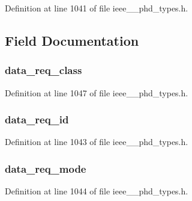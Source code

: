 Definition at line 1041 of file ieee\+\_\+\_\+phd\+\_\+types.\+h.



\subsection{Field Documentation}
\hypertarget{struct___data_request_a0337e79eff177bd5bdc454d9d86aff34}{}
\subsubsection[{data\+\_\+req\+\_\+class}]{ data\+\_\+req\+\_\+class}\label{struct___data_request_a0337e79eff177bd5bdc454d9d86aff34}


Definition at line 1047 of file ieee\+\_\+\_\+phd\+\_\+types.\+h.

\hypertarget{struct___data_request_a1c786af4096ed61c5f6cfdf27f317b70}{}
\subsubsection[{data\+\_\+req\+\_\+id}]{ data\+\_\+req\+\_\+id}\label{struct___data_request_a1c786af4096ed61c5f6cfdf27f317b70}


Definition at line 1043 of file ieee\+\_\+\_\+phd\+\_\+types.\+h.

\hypertarget{struct___data_request_aad6b7d207038ee232636dfe697e6027f}{}
\subsubsection[{data\+\_\+req\+\_\+mode}]{ data\+\_\+req\+\_\+mode}\label{struct___data_request_aad6b7d207038ee232636dfe697e6027f}


Definition at line 1044 of file ieee\+\_\+\_\+phd\+\_\+types.\+h.

